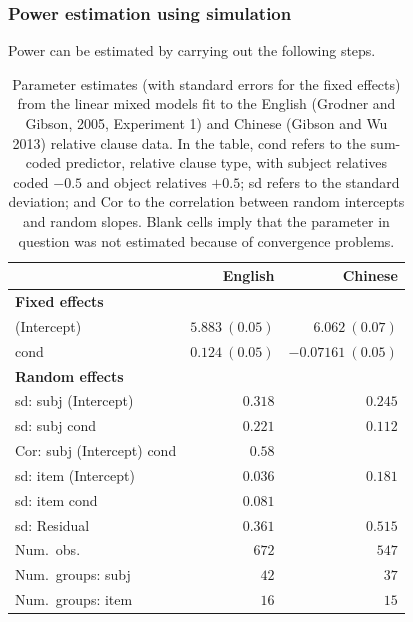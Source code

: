 \documentclass{ar-1col}\usepackage[]{graphicx}\usepackage[]{color}
\begin{document}
\subsubsection{Power estimation using simulation}

Power can be estimated by carrying out the following steps.

\begin{table}[h]
\caption{Parameter estimates (with standard errors for the fixed effects)  from the linear mixed models fit to the English (Grodner and Gibson, 2005, Experiment 1) and Chinese (Gibson and Wu 2013) relative clause data. In the table, cond refers to the sum-coded  predictor, relative clause type, with subject relatives coded $-0.5$ and object relatives $+0.5$; sd refers to the standard deviation; and Cor to the correlation between random intercepts and random slopes. Blank cells imply that the parameter in question was not estimated because of convergence problems.}
\label{table:coefficients}
\begin{center}
\begin{tabular}{@{}|l|r|r|@{}}
\hline
 & English & Chinese \\
\hline
\textbf{Fixed effects} & & \\
(Intercept)                & $5.883~(0.05)$   & $6.062~(0.07)$ \\
cond                       & $0.124~(0.05)$   & $-0.07161~(0.05)$      \\
\hline
\textbf{Random effects} & & \\
sd: subj (Intercept)      & $0.318$       & $0.245$       \\
sd: subj cond             & $0.221$       & $0.112$           \\
Cor: subj (Intercept) cond & $0.58$       &            \\
sd: item (Intercept)      & $0.036$       & $0.181$       \\
sd: item cond      & $0.081$       &        \\
sd: Residual              & $0.361$       & $0.515$       \\
\hline
Num.\ obs.                  & $672$        & $547$        \\
Num.\ groups: subj          & $42$         & $37$         \\
Num.\ groups: item          & $16$         & $15$         \\
\hline
\end{tabular}
\end{center}
\end{table}
\end{document}
